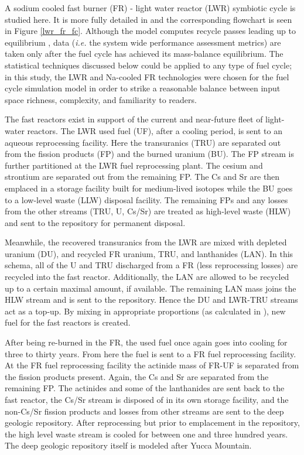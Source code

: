 A sodium cooled fast burner (FR) - light water reactor (LWR) symbiotic cycle is studied here.
It is more fully detailed in \cite{Li2009b} and the corresponding flowchart
is seen in Figure \ref{lwr_fr_fc}. Although the model computes recycle passes
leading up to equilibrium \cite{Scopatz2009}, data (\emph{i.e.} the system wide performance
assessment metrics) are taken only after the fuel cycle has achieved its mass-balance equilibrium.
The statistical techniques discussed below could be applied to any type of fuel cycle; in this study,
the LWR and Na-cooled FR technologies were chosen for the fuel cycle simulation model
in order to strike a reasonable balance between input space richness, complexity, and familiarity to readers.

The fast reactors exist in support of the current and near-future
fleet of light-water reactors. The LWR used fuel (UF), after a cooling
period, is sent to an aqueous reprocessing facility. Here the transuranics (TRU) are separated out
from the fission products (FP) and
the burned uranium (BU).  The FP stream is further partitioned at the
LWR fuel reprocessing plant. The cesium and strontium are
separated out from the remaining FP. The Cs and Sr are
then emplaced in a storage facility built for medium-lived
isotopes while the BU goes to a low-level waste (LLW) disposal facility.
The remaining FPs and any losses from the other
streams (TRU, U, Cs/Sr) are treated as high-level waste (HLW) and sent to
the repository for permanent disposal.

Meanwhile, the recovered transuranics from the LWR
are mixed with depleted uranium (DU), and recycled FR
uranium, TRU, and lanthanides (LAN). In this schema, all of the U and TRU
discharged from a FR (less reprocessing losses) are recycled into the fast reactor.
Additionally, the LAN are allowed to be recycled up to a certain maximal amount, if available.
The remaining LAN mass joins the HLW stream and is sent to the repository.
Hence the DU and LWR-TRU streams act as a top-up. By mixing in appropriate proportions (as
calculated in \cite{Scopatz2009}), new fuel for the fast reactors is
created.

After being re-burned in the FR, the used fuel once
again goes into cooling for three to thirty years. From here the fuel
is sent to a FR fuel reprocessing facility.  At the FR fuel reprocessing facility the actinide mass
of FR-UF is separated from the fission products present.
Again, the Cs and Sr are separated from the remaining FP.
The actinides and some of the lanthanides are sent back to the fast reactor, the Cs/Sr
stream is disposed of in its own storage facility, and the
non-Cs/Sr fission products and losses from other streams
are sent to the deep geologic repository.  After reprocessing but prior to emplacement in 
the repository, the high level waste
stream is cooled for between one and three hundred years.
The deep geologic repository itself is modeled after
Yucca Mountain.



